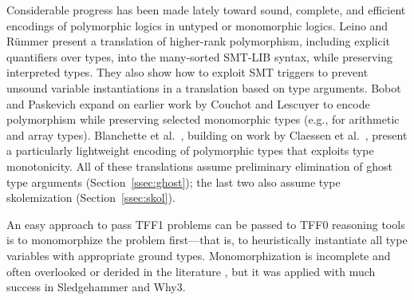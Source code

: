 Considerable progress has been made lately toward sound, complete, and efficient
encodings of polymorphic logics in untyped or monomorphic logics. Leino and
R\"ummer \cite{leino-ruemmer-2010} present a translation of higher-rank
polymorphism, including explicit quantifiers over types, into the many-sorted
SMT-LIB syntax, while preserving interpreted types. They also show how to
exploit SMT triggers to prevent unsound variable instantiations in a
translation based on type arguments. Bobot and Paskevich
\cite{bobot-paskevich-2011} expand on earlier work by Couchot and Lescuyer
\cite{couchot-lescuyer-2007} to encode polymorphism while preserving selected
monomorphic types (e.g., for arithmetic and array types).
Blanchette et
al.\ \cite{blanchette-et-al-2012-mono}, building on work by Claessen et al.\
\cite{claessen-et-al-2011}, present a particularly lightweight encoding of
polymorphic types that exploits type monotonicity. All of these translations
assume preliminary elimination of ghost type arguments
(Section~\ref{ssec:ghost}); the last two also assume type skolemization
(Section~\ref{ssec:skol}).

An easy approach to pass TFF1 problems can be passed to TFF0
reasoning tools is to monomorphize the problem first---that is, to heuristically
instantiate all type variables with appropriate
ground types. Monomorphization is incomplete and often overlooked
or derided in the literature \cite[p.\ 3]{couchot-lescuyer-2007}, but it was
applied with much success in Sledgehammer \cite[\S6]{blanchette-et-al-2012-mono}
and Why3.
